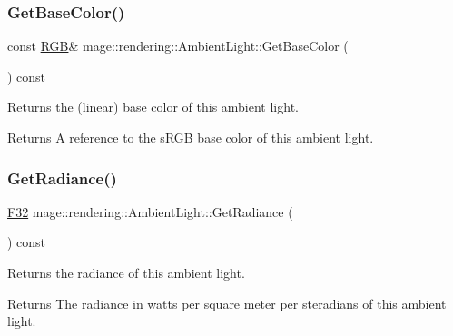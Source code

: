 \subsubsection{\texorpdfstring{Get\+Base\+Color()}{GetBaseColor()}\hspace{0.1cm}{\footnotesize\ttfamily [2/2]}}
{\footnotesize\ttfamily const \mbox{\hyperlink{structmage_1_1_r_g_b}{R\+GB}}\& mage\+::rendering\+::\+Ambient\+Light\+::\+Get\+Base\+Color (\begin{DoxyParamCaption}{ }\end{DoxyParamCaption}) const\hspace{0.3cm}{\ttfamily [noexcept]}}

Returns the (linear) base color of this ambient light.

\begin{DoxyReturn}{Returns}
A reference to the s\+R\+GB base color of this ambient light. 
\end{DoxyReturn}
\mbox{\label{classmage_1_1rendering_1_1_ambient_light_ad78278e798956e1c3a707a37dfb052da}} 
\subsubsection{\texorpdfstring{Get\+Radiance()}{GetRadiance()}}
{\footnotesize\ttfamily \mbox{\hyperlink{namespacemage_aa97e833b45f06d60a0a9c4fc22ae02c0}{F32}} mage\+::rendering\+::\+Ambient\+Light\+::\+Get\+Radiance (\begin{DoxyParamCaption}{ }\end{DoxyParamCaption}) const\hspace{0.3cm}{\ttfamily [noexcept]}}

Returns the radiance of this ambient light.

\begin{DoxyReturn}{Returns}
The radiance in watts per square meter per steradians of this ambient light. 
\end{DoxyReturn}
\mbox{\label{classmage_1_1rendering_1_1_ambient_light_a480e6b39d92266254778c23e8456e55e}} 
